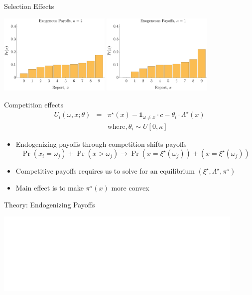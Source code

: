 \documentclass{beamer}
\begin{document}
\begin{frame}{Selection Effects}
    \begin{center}
        \includegraphics[width=0.4\textwidth]{./ih/pred_hist_ex_2.pdf}
        \includegraphics[width=0.4\textwidth]{./ih/pred_hist_ex_1.pdf}
    \end{center}
\end{frame}

\begin{frame}{Competition effects}
    \begin{eqnarray*}
    U_{i}(\omega,x;\theta) & = & \pi^{\star}(x)-\boldsymbol{1}_{\omega\not=x}\cdot c-\theta_{i}\cdot\Lambda^{\star}(x)\\
     & \text{} & \text{where},\theta_{i}\sim U[0,\kappa]
    \end{eqnarray*}

    \begin{itemize}
        \item Endogenizing payoffs through competition shifts payoffs
        \[
        \Pr(x_{i}=\omega_{j})+\Pr(x>\omega_{j})\rightarrow\Pr\left(x=\xi^{\star}(\omega_{j})\right)+\left(x=\xi^{\star}(\omega_{j})\right)
        \]
        \item Competitive payoffs requires us to solve for an equilibrium $(\xi^{\star},\Lambda^{\star},\pi^{\star})$
        \item Main effect is to make\textrm{ $\pi^{\star}(x)$ more convex}
    \end{itemize}
\end{frame}

\begin{frame}{Theory: Endogenizing Payoffs}
    \begin{center}
        \includegraphics<1>[width=0.9\textwidth]{./ih/ExpectUtilityRep3.pdf}
    \end{center}
\end{frame}
\end{document}
